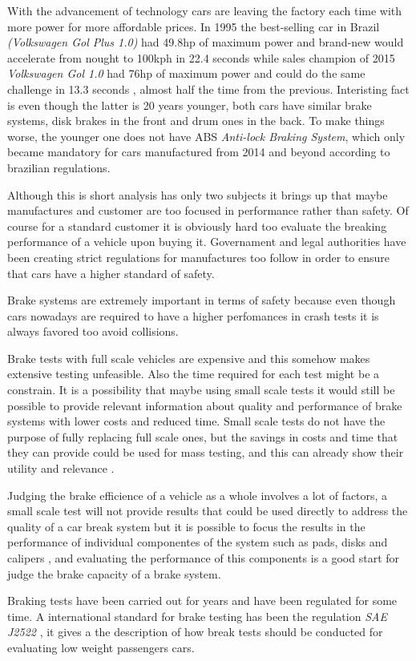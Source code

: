 With the advancement of technology cars are leaving the factory each time with more power for more affordable prices. In 1995 the best-selling car in Brazil \cite{lideres-vendas-brasil} \textit{(Volkswagen Gol Plus 1.0)} had 49.8hp of maximum power and brand-new would accelerate from nought to 100kph in 22.4 seconds \cite{cnwgol1993} while sales champion of 2015 \textit{Volkswagen Gol 1.0} had 76hp of maximum power and could do the same challenge in 13.3 seconds \cite{cnwgol2013}, almost half the time from the previous. Interisting fact is even though the latter is 20 years younger, both cars have similar brake systems, disk brakes in the front and drum ones in the back. To make things worse, the younger one does not have ABS \textit{Anti-lock Braking System}, which only became mandatory for cars manufactured from 2014 and beyond according to brazilian regulations.
	\par
	Although this is short analysis has only two subjects it brings up that maybe manufactures and customer are too focused in performance rather than safety. Of course for a standard customer it is obviously hard too evaluate the breaking performance of a vehicle upon buying it. Governament and legal authorities have been creating strict regulations for manufactures too follow in order to ensure that cars have a higher standard of safety.
	\par
	Brake systems are extremely important in terms of safety because even though cars nowadays are required to have a higher perfomances in crash tests it is always favored too avoid collisions.
	\par
	Brake tests with full scale vehicles are expensive and this somehow makes extensive testing unfeasible. Also the time required for each test might be a constrain. It is a possibility that maybe using small scale tests it would still be possible to provide relevant information about quality and performance of brake systems with lower costs and reduced time. Small scale tests do not have the purpose of fully replacing full scale ones, but the savings in costs and time that they can provide could be used for mass testing, and this can already show their utility and relevance \cite{gardinalli2005comparaccao}. 
	\par
	Judging the brake efficience of a vehicle as a whole involves a lot of factors, a small scale test will not provide results that could be used directly to address the quality of a car break system but it is possible to focus the results in the performance of individual componentes of the system such as pads, disks and calipers \cite{halderman2016automotive}, and evaluating the performance of this components is a good start for judge the brake capacity of a brake system.
	\par
	Braking tests have been carried out for years and have been regulated for some time. A international standard for brake testing has been the regulation \textit{SAE J2522} \cite{sae}, it gives a the description of how break tests should be conducted for evaluating low weight passengers cars.
